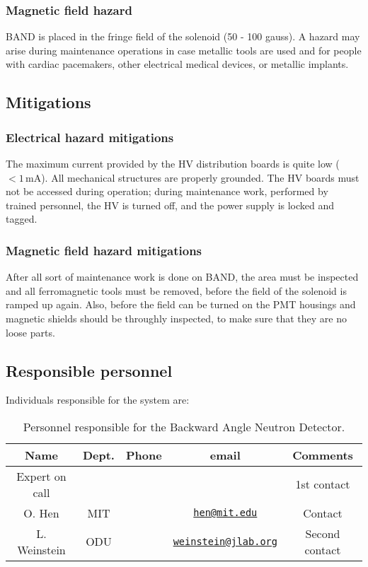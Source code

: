 \subsubsection{Magnetic field hazard}
BAND is placed in the fringe field of the solenoid (50 - 100 gauss). A hazard may arise during maintenance operations in case metallic tools are used and for people with cardiac pacemakers, other electrical medical devices, or metallic implants.


\subsection{Mitigations}
\indent
\subsubsection{Electrical hazard mitigations} 
The maximum current provided by the HV distribution boards is quite low ($<1\,\mathrm{mA}$). All mechanical structures are properly grounded. The HV boards must not be accessed during operation; during maintenance work, performed by trained personnel, the HV is turned off, and the power supply is locked and tagged.
\subsubsection{Magnetic field hazard mitigations}
After all sort of maintenance work is done on BAND, the area must be inspected and all ferromagnetic tools must be removed, before the field of the solenoid is ramped up again. Also, before the field can be turned on the PMT housings and magnetic shields should be throughly inspected, to make sure that they are no loose parts. 



\subsection{Responsible personnel}
\indent

Individuals responsible for the system are:

\begin{table}[!htb]
 \centering
 \begin{tabular}{|c|c|c|c|c|}
\hline
 Name&Dept.&Phone&email&Comments \\ \hline
 Expert on call& &&& 1st contact \\ \hline
O. Hen & MIT & &\href{mailto:hen@mit.edu}{\nolinkurl{hen@mit.edu}}& Contact \\ \hline
L. Weinstein & ODU &  &\href{mailto:weinstein@jlab.org}{\nolinkurl{weinstein@jlab.org}}& Second contact  \\ \hline

 \end{tabular}
\caption{Personnel responsible for the Backward Angle Neutron Detector.} 
\label{tb:band}
\end{table}

